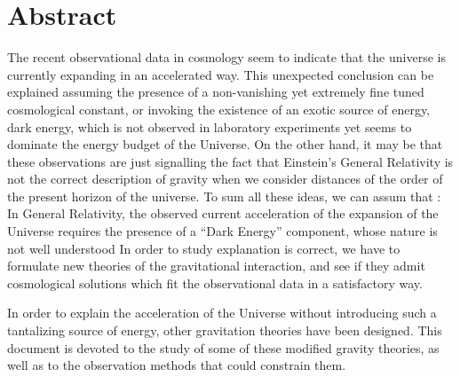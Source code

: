 \documentclass[a4paper,12pt]{report}
\theoremstyle{plain}
\theoremstyle{plain}
\begin{document}
\chapter*{Abstract}
The recent observational data in cosmology seem to indicate that the universe
is currently expanding in an accelerated way. This unexpected conclusion can
be explained assuming the presence of a non-vanishing yet extremely fine tuned
cosmological constant, or invoking the existence of an exotic source of energy, dark
energy, which is not observed in laboratory experiments yet seems to dominate
the energy budget of the Universe. On the other hand, it may be that these
observations are just signalling the fact that Einstein’s General Relativity is not
the correct description of gravity when we consider distances of the order of the
present horizon of the universe. To sum all these ideas, we can assum that : In  General Relativity, the observed current acceleration of the expansion
of the Universe requires the presence of a “Dark Energy” component, whose nature is not
well understood
In order to study  explanation is correct, we have to formulate
new theories of the gravitational interaction, and see if they admit cosmological
solutions which fit the observational data in a satisfactory way. 

In order to explain the acceleration of the Universe without introducing
such a tantalizing source of energy, other gravitation theories have been designed. This
document is devoted to the study of some of these modified gravity theories, as well as to the
observation methods that could constrain them.
\end{document}
